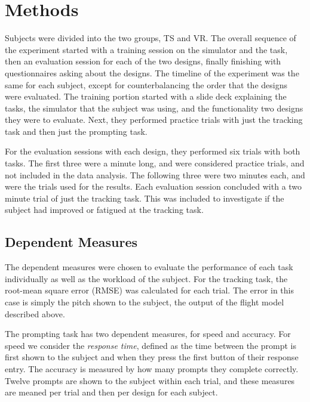 
\section{Methods}

Subjects were divided into the two groups, TS and VR.
The overall sequence of the experiment started with a training session on the simulator and the task, then an evaluation session for each of the two designs, finally finishing with questionnaires asking about the designs.
The timeline of the experiment was the same for each subject, except for counterbalancing the order that the designs were evaluated.
The training portion started with a slide deck explaining the tasks, the simulator that the subject was using, and the functionality two designs they were to evaluate.
Next, they performed practice trials with just the tracking task and then just the prompting task.

For the evaluation sessions with each design, they performed six trials with both tasks.
The first three were a minute long, and were considered practice trials, and not included in the data analysis.
The following three were two minutes each, and were the trials used for the results.
Each evaluation session concluded with a two minute trial of just the tracking task.
This was included to investigate if the subject had improved or fatigued at the tracking task.

\subsection{Dependent Measures}

The dependent measures were chosen to evaluate the performance of each task individually as well as the workload of the subject.
For the tracking task, the root-mean square error (RMSE) was calculated for each trial.
The error in this case is simply the pitch shown to the subject, the output of the flight model described above.

The prompting task has two dependent measures, for speed and accuracy.
For speed we consider the \textit{response time}, defined as the time between the prompt is first shown to the subject and when they press the first button of their response entry.
The accuracy is measured by how many prompts they complete correctly.
Twelve prompts are shown to the subject within each trial, and these measures are meaned per trial and then per design for each subject.

